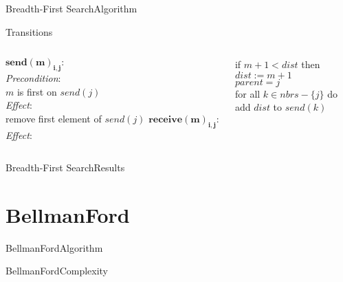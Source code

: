 \documentclass[pdf]{beamer}
\begin{document}
\begin{frame}{Breadth-First Search}{Algorithm}
	\begin{block}{Transitions}
        \vspace{2mm}
        \begin{columns}
            $\mathbf{send(m)_{i, j}:}$\\ 
                \emph{Precondition}: \\ 
                \small $m$ is first on $send(j)$ \\
                \normalsize \emph{Effect}: \\
                \small remove first element of $send(j)$
            \normalsize $\mathbf{receive(m)_{i, j}: }$ \\
                \emph{Effect}: \\
                \small
                \begin{tcolorbox}[colframe=red]
                    if $m+1 < dist$ then \\
                    \hspace*{\parindent} $dist := m+1$ \\
                    \hspace*{\parindent} $parent = j$ \\
                    \hspace*{\parindent} for all $k \in nbrs - \{j\}$ do \\
                    \hspace*{\parindent} \hspace*{\parindent} add $dist$ to $send(k)$ \\
                \end{tcolorbox}
        \end{columns}
	\end{block}
\end{frame}

\begin{frame}{Breadth-First Search}{Results}
    
\end{frame}

\section{BellmanFord}
\begin{frame}{BellmanFord}{Algorithm}
	
	
\end{frame}
\begin{frame}{BellmanFord}{Complexity}
	
	
\end{frame}
\end{document}
